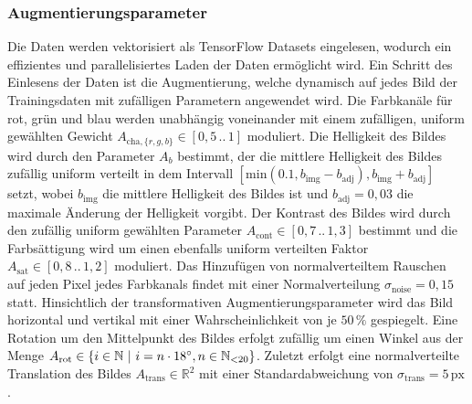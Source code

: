 \subsubsection{Augmentierungsparameter}

Die Daten werden vektorisiert als TensorFlow Datasets eingelesen, wodurch ein effizientes und parallelisiertes Laden der Daten ermöglicht wird. Ein Schritt des Einlesens der Daten ist die Augmentierung, welche dynamisch auf jedes Bild der Trainingsdaten mit zufälligen Parametern angewendet wird. Die Farbkanäle für rot, grün und blau werden unabhängig voneinander mit einem zufälligen, uniform gewählten Gewicht $A_{\text{cha}, \{r,g,b\}} \in [0,\!5\,..\,1]$ moduliert. Die Helligkeit des Bildes wird durch den Parameter $A_b$ bestimmt, der die mittlere Helligkeit des Bildes zufällig uniform verteilt in dem Intervall $[\text{min}(0.1, b_\text{img}-b_\text{adj}), b_\text{img} + b_\text{adj}]$ setzt, wobei $b_\text{img}$ die mittlere Helligkeit des Bildes ist und $b_\text{adj} = 0,\!03$ die maximale Änderung der Helligkeit vorgibt. Der Kontrast des Bildes wird durch den zufällig uniform gewählten Parameter $A_\text{cont} \in [0,\!7\,..\,1,\!3]$ bestimmt und die Farbsättigung wird um einen ebenfalls uniform verteilten Faktor $A_\text{sat} \in [0,\!8\,..\, 1,\!2]$ moduliert. Das Hinzufügen von normalverteiltem Rauschen auf jeden Pixel jedes Farbkanals findet mit einer Normalverteilung $\sigma_\text{noise} = 0,\!15$ statt. Hinsichtlich der transformativen Augmentierungsparameter wird das Bild horizontal und vertikal mit einer Wahrscheinlichkeit von je $50\,\%$ gespiegelt. Eine Rotation um den Mittelpunkt des Bildes erfolgt zufällig um einen Winkel aus der Menge $A_\text{rot} \in \{i \in \mathbb{N} ~\vert~ i = n \cdot 18^{\circ}, n \in \mathbb{N}_{<20}\}$. Zuletzt erfolgt eine normalverteilte Translation des Bildes $A_\text{trans} \in \mathbb{R}^2$ mit einer Standardabweichung von $\sigma_\text{trans} = 5\,\text{px}$.
